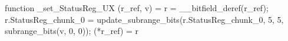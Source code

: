 function _set_StatusReg_UX (r_ref, v) = {
    r = __bitfield_deref(r_ref);
    r.StatusReg_chunk_0 = update_subrange_bits(r.StatusReg_chunk_0, 5, 5, subrange_bits(v, 0, 0));
    (*r_ref) = r
}
